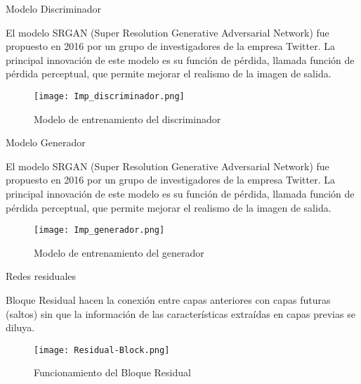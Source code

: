 \begin{frame}{Modelo Discriminador}
    

    El modelo SRGAN (Super Resolution Generative Adversarial Network) fue
    propuesto en 2016 por un grupo de investigadores de la empresa Twitter.
    La principal innovación de este modelo es su función de pérdida, llamada
    función de pérdida perceptual, que permite mejorar el realismo de la imagen de
    salida.

        
    \begin{figure}[H]
        \begin{center}
          \texttt{[image: Imp\_discriminador.png]}
          \caption{Modelo de entrenamiento del discriminador}
          \label{Alexis3}
        \end{center}
    \end{figure}
     

\end{frame}

\begin{frame}{Modelo Generador}
    

    El modelo SRGAN (Super Resolution Generative Adversarial Network) fue
    propuesto en 2016 por un grupo de investigadores de la empresa Twitter.
    La principal innovación de este modelo es su función de pérdida, llamada
    función de pérdida perceptual, que permite mejorar el realismo de la imagen de
    salida.

        
    \begin{figure}[H]
        \begin{center}
          \texttt{[image: Imp\_generador.png]}
          \caption{Modelo de entrenamiento del generador}
          \label{Alexis4}
        \end{center}
    \end{figure}
     

\end{frame}



\begin{frame}{Redes residuales}
    \begin{block}{Bloque Residual}
        hacen la conexión entre capas anteriores con capas futuras (saltos) sin que la información de 
        las características extraídas en capas previas se diluya.
    \end{block}
    \begin{figure}[H]
        \begin{center}
          \texttt{[image: Residual-Block.png]}
          \caption{Funcionamiento del Bloque Residual}
          \label{Alexis10}
        \end{center}
    \end{figure}

\end{frame}


